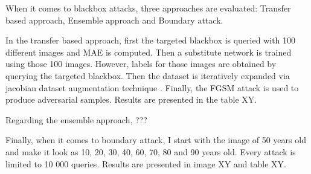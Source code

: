 When it comes to blackbox attacks, three approaches are evaluated: Transfer based approach, Ensemble approach and Boundary attack.

In the transfer based approach, first the targeted blackbox is queried with 100 different images and MAE is computed. Then a substitute network is trained using those 100 images. However, labels for those images are obtained by querying the targeted blackbox. Then the dataset is iteratively expanded via jacobian dataset augmentation technique . Finally, the FGSM attack is used to produce adversarial samples. Results are presented in the table XY.

Regarding the ensemble approach, ???

Finally, when it comes to boundary attack, I start with the image of 50 years old and make it look as 10, 20, 30, 40, 60, 70, 80 and 90 years old. Every attack is limited to 10 000 queries. Results are presented in image XY and table XY.



